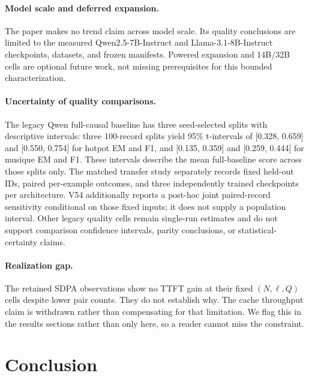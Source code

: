 \paragraph{Model scale and deferred expansion.}
The paper makes no trend claim across model scale. Its quality conclusions are
limited to the measured Qwen2.5-7B-Instruct and Llama-3.1-8B-Instruct
checkpoints, datasets, and frozen manifests. Powered expansion and 14B/32B
cells are optional future work, not missing prerequisites for this bounded
characterization.

\paragraph{Uncertainty of quality comparisons.}
The legacy Qwen full-causal baseline has three seed-selected splits with
descriptive intervals: three 100-record splits yield 95\% t-intervals of
[0.328, 0.659] and [0.550, 0.754] for hotpot EM and F1, and [0.135, 0.359]
and [0.259, 0.444] for musique EM and F1. These intervals describe the mean
full-baseline score across those splits only. The matched transfer study
separately records fixed held-out IDs, paired per-example outcomes, and three
independently trained checkpoints per architecture. V54 additionally reports a
post-hoc joint paired-record sensitivity conditional on those fixed inputs; it
does not supply a population interval. Other legacy quality cells
remain single-run estimates and do not support comparison confidence intervals,
parity conclusions, or statistical-certainty claims.

\paragraph{Realization gap.}
The retained SDPA observations show no TTFT gain at their fixed $(N,\ell,Q)$
cells despite lower pair counts. They do not establish why. The cache throughput
claim is withdrawn rather than compensating for that limitation. We flag this
in the results sections rather than only here, so a reader cannot miss the
constraint.

\section{Conclusion}
\label{sec:conclusion}

